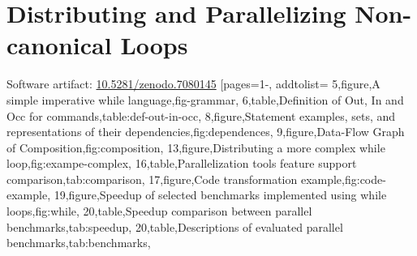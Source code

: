 \chapter{Distributing and Parallelizing Non-canonical Loops}
\label{app:sec:vmcai}
{\noindent Software artifact: \href{https://zenodo.org/records/7080145}{10.5281/zenodo.7080145}}
[pages={1-}, addtolist={
5,figure,A simple imperative while language,fig-grammar,
6,table,{Definition of Out, In and Occ for commands},table:def-out-in-occ,
8,figure,{Statement examples, sets, and representations of their dependencies},fig:dependences,
9,figure,Data-Flow Graph of Composition,fig:composition,
13,figure,Distributing a more complex while loop,fig:exampe-complex,
16,table,Parallelization tools feature support comparison,tab:comparison,
17,figure,Code transformation example,fig:code-example,
19,figure,Speedup of selected benchmarks implemented using while loops,fig:while,
20,table,Speedup comparison between parallel benchmarks,tab:speedup,
20,table,Descriptions of evaluated parallel benchmarks,tab:benchmarks},
